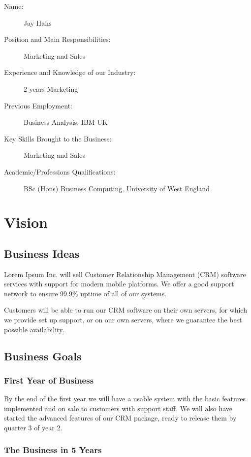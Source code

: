 \documentclass[DIV=calc, paper=a4, fontsize=11pt]{scrartcl}	 %
\begin{document}
\begin{description}
\item[Name:] Jay Hans
\item[Position and Main Responsibilities:] Marketing and Sales
\item[Experience and Knowledge of our Industry:] 2 years Marketing
\item[Previous Employment:] Business Analysis, IBM UK
\item[Key Skills Brought to the Business:] Marketing and Sales
\item[Academic/Professions Qualifications:] BSc (Hons) Business Computing, University of West England
\end{description}


\section{Vision}

\subsection{Business Ideas}
Lorem Ipsum Inc. will sell Customer Relationship Management (CRM) software services with support
for modern mobile platforms. We offer a good support network to ensure 99.9\% uptime of all of our
systems.

Customers will be able to run our CRM software on their own servers, for which we provide set up
support, or on our own servers, where we guarantee the best possible availability.

\subsection{Business Goals}
\subsubsection*{First Year of Business}
By the end of the first year we will have a usable system with the basic features implemented and
on sale to customers with support staff. We will also have started the advanced features of our
CRM package, ready to release them by quarter 3 of year 2. 

\subsubsection*{The Business in 5 Years}
\end{document}
